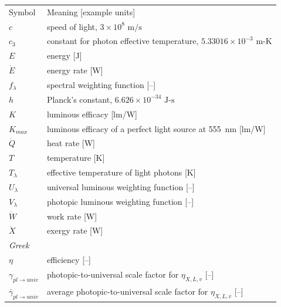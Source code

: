 \documentclass[energies,article,accept,moreauthors,pdftex]{Definitions/mdpi}\usepackage[]{graphicx}\usepackage[]{color}
\newcommand{\gammarat}{\gamma_{pl\rightarrow{}univ}}
\newcommand{\gammaratavg}{\bar{\gamma}_{pl\rightarrow{}univ}}
\begin{document}

\vspace{6pt}
 \noindent
\begin{tabular}{ll}
Symbol & Meaning [example units] \\ 
%
%
%
  $c$ & speed of light, $3 \times 10^8 \text{ m/s}$ \\
  $c_3$ & constant for photon effective temperature, $5.33016 \times 10^{-3} \text{ m-K}$ \\
  $E$ & energy [J] \\
  $\dot{E}$ & energy rate [W] \\
  $f_\lambda$ & spectral weighting function [--] \\
  $h$ & Planck's constant, $6.626 \times 10^{-34} \text{ J-s}$ \\
  $K$ & luminous efficacy [lm/W] \\
  $K_{max}$ & luminous efficacy of a perfect light source at 555~nm [lm/W] \\
  $\dot{Q}$ & heat rate [W] \\
  $T$ & temperature [K] \\
  $T_\lambda$ & effective temperature of light photons [K] \\
  $U_\lambda$ & universal luminous weighting function [--] \\
  $V_\lambda$ & photopic luminous weighting function [--] \\
  $\dot{W}$ & work rate [W] \\
  $\dot{X}$ & exergy rate [W] \\
%
\multicolumn{2}{l}{\emph{Greek}} \\ 
%
  $\eta$ & efficiency [--] \\
  $\gammarat$ & photopic-to-universal scale factor for $\eta_{X,L,v}$ [--] \\
  $\gammaratavg$ & average photopic-to-universal scale factor for $\eta_{X,L,v}$ [--] \\

\end{tabular}
\end{document}
